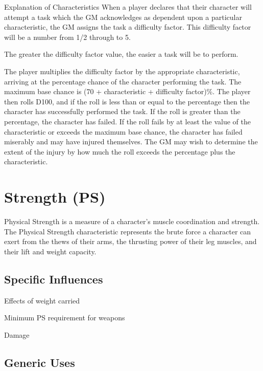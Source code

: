 \begin{Chapter}{Explanation of Characteristics}
When a player declares that their character will attempt a task which
the GM acknowledges as dependent upon a particular characteristic, the
GM assigns the task a difficulty factor.  This difficulty factor will
be a number from 1/2 through to 5.

The greater the difficulty factor value, the easier a task will be to
perform.

The player multiplies the difficulty factor by the appropriate
characteristic, arriving at the percentage chance of the character
performing the task.  The maximum base chance is (70 + characteristic
+ difficulty factor)\%.  The player then rolls D100, and if the roll
is less than or equal to the percentage then the character has
successfully performed the task.  If the roll is greater than the
percentage, the character has failed.  If the roll fails by at least
the value of the characteristic or exceeds the maximum base chance,
the character has failed miserably and may have injured themselves.
The GM may wish to determine the extent of the injury by how much the
roll exceeds the percentage plus the characteristic.


\section{Strength (PS)}

Physical Strength is a measure of a character’s muscle coordination
and strength.  The Physical Strength characteristic represents the
brute force a character can exert from the thews of their arms, the
thrusting power of their leg muscles, and their lift and weight
capacity.

\subsection{Specific Influences}


\begin{Itemize}

\item Effects of weight carried  

\item Minimum PS requirement for weapons

\item Damage 

\end{Itemize}

\subsection{Generic Uses}


\end{Chapter}
